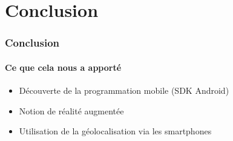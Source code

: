 \section{Conclusion}

\begin{frame}
\frametitle{Conclusion}
\framesubtitle{Ce que cela nous a apporté}
\begin{itemize}
	\item Découverte de la programmation mobile (SDK Android)
	\item Notion de réalité augmentée
	\item Utilisation de la géolocalisation via les smartphones
\end{itemize}
\end{frame}
